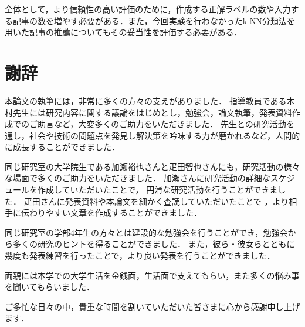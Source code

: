 \documentclass[12pt,a4j]{jreport}
\begin{document}
全体として，より信頼性の高い評価のために，作成する正解ラベルの数や入力する記事の数を増やす必要がある．また，今回実験を行わなかったk-NN分類法を用いた記事の推薦についてもその妥当性を評価する必要がある．



\chapter*{謝辞}

本論文の執筆には，非常に多くの方々の支えがありました．
指導教員である木村先生には研究内容に関する議論をはじめとし，勉強会，論文執筆，発表資料作成でのご助言など，大変多くのご助力をいただきました．
先生との研究活動を通し，社会や技術の問題点を発見し解決策を吟味する力が磨かれるなど，人間的に成長することができました．

同じ研究室の大学院生である加瀬裕也さんと疋田智也さんにも，研究活動の様々な場面で多くのご助力をいただきました．
加瀬さんに研究活動の詳細なスケジュールを作成していただいたことで，
円滑な研究活動を行うことができました．
疋田さんに発表資料や本論文を細かく査読していただいたことで
，より相手に伝わりやすい文章を作成することができました．

同じ研究室の学部4年生の方々とは建設的な勉強会を行うことができ，勉強会から多くの研究のヒントを得ることができました．
また，彼ら・彼女らとともに幾度も発表練習を行ったことで，より良い発表を行うことができました．

両親には本学での大学生活を金銭面，生活面で支えてもらい，また多くの悩み事を聞いてもらいました．

ご多忙な日々の中，貴重な時間を割いていただいた皆さまに心から感謝申し上げます．




\end{document}
